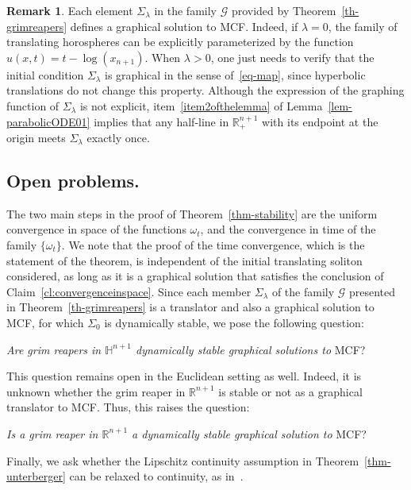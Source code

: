 \documentclass{amsart}[12pt]
\newcommand{\hn}[1]{\h^{#1}}
\renewcommand{\S}{\Sigma}
\theoremstyle{definition}
\newtheorem{remark}[theorem]{Remark}
\theoremstyle{plain}
\newcommand{\R}{\mathbb{R} }
\newcommand{\h}{\mathbb{H} }
\renewcommand{\Sigma}{\varSigma}
\begin{document}
\begin{remark}\label{rem-soliton}
Each element $\S_\lambda$ in the family $\mathscr G$
provided by Theorem~\ref{th-grimreapers} defines a graphical
solution to MCF. Indeed, if $\lambda = 0$, the family of translating
horospheres can be explicitly parameterized by the function
$u(x,t) = t - \log(x_{n+1})$. When $\lambda >0$, one just needs
to verify that the initial condition $\Sigma_\lambda$ is
graphical in the sense of~\eqref{eq-map}, since hyperbolic translations
do not change this property. Although
the expression of the graphing function of $\S_\lambda$
is not explicit, item~\ref{item2ofthelemma} of
Lemma~\ref{lem-parabolicODE01} implies that
any half-line in $\R^{n+1}_+$ with its endpoint
at the origin meets $\S_\lambda$ exactly once.
\end{remark}

\subsection{Open problems.}
The two main steps in the proof of Theorem~\ref{thm-stability}
are the uniform convergence in space of the functions $\omega_t$,
and the convergence in time of the family $\{\omega_t\}$. We note
that the proof of the time convergence, which is the statement of
the theorem, is independent of the initial
translating soliton considered, as long as it is a graphical solution
that satisfies the conclusion of Claim~\ref{cl:convergenceinspace}.
Since each member $\S_\lambda$ of the family $\mathscr G$ presented
in Theorem~\ref{th-grimreapers} is a translator and also
a graphical solution to MCF, for which $\Sigma_0$ is dynamically stable,
we pose the following question:
\begin{center}
{\em Are grim reapers
in $\hn{n+1}$ dynamically stable graphical solutions
to} MCF?
\end{center}

This question remains open in the Euclidean
setting as well. Indeed, it is unknown whether
the grim reaper in $\R^{n+1}$
is stable or not as a graphical translator to MCF. Thus,
this raises the question:
\begin{center}
{\em Is a grim reaper in $\R^{n+1}$ a
dynamically stable graphical solution to} MCF?
\end{center}

Finally, we ask whether the Lipschitz continuity assumption
in Theorem~\ref{thm-unterberger} can be relaxed to continuity,
as in~\cite{schulze,EH}.
\end{document}
